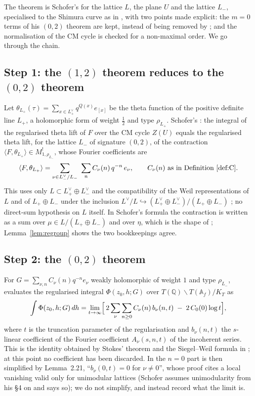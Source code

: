 \documentclass[11pt,reqno]{amsart}
\theoremstyle{plain}
\theoremstyle{definition}
\newcommand{\Q}{\mathbb{Q}}
\newcommand{\A}{\mathbb{A}}
\newcommand{\Ldual}{L^{\vee}}
\newcommand{\Lm}{L_{-}}
\newcommand{\Lp}{L_{+}}
\begin{document}
The theorem is Schofer's \cite[Thm.~3.4(ii), Cor.~3.5(i)]{Schofer} for the lattice $L$, the
plane $U$ and the lattice $\Lm$, specialised to the Shimura curve as in \cite[Thm.~B]{Yang}, with
two points made explicit: the $m=0$ terms of his $(0,2)$ theorem are kept, instead of being
removed by \cite[Lemma~2.21]{Schofer}; and the normalisation of the CM cycle is checked for a
non-maximal order. We go through the chain.

\subsection*{Step 1: the $(1,2)$ theorem reduces to the $(0,2)$ theorem}
Let $\theta_{\Lp}(\tau)=\sum_{x\in\Lp^\vee}q^{Q(x)}e_{[x]}$ be the theta function of the positive
definite line $\Lp$, a holomorphic form of weight $\tfrac12$ and type $\rho_{\Lp}$. Schofer's
\cite[Prop.~3.1, Cor.~3.2]{Schofer}: the integral of the regularised theta lift of $F$ over the
CM cycle $Z(U)$ equals the regularised theta lift, for the lattice $\Lm$ of signature $(0,2)$,
of the contraction $\langle F,\theta_{\Lp}\rangle\in M^!_{1,\rho_{\Lm}}$, whose Fourier coefficients
are
\[
  \langle F,\theta_{\Lp}\rangle=\sum_{\nu\in\Lm^\vee/\Lm}\ \sum_{n}C_\nu(n)\,q^{-n}\,e_\nu,
  \qquad C_\nu(n)\text{ as in Definition~\ref{def:C}}.
\]
This uses only $L\subset\Lp^\vee\oplus\Lm^\vee$ and the compatibility of the Weil representations
of $L$ and of $\Lp\oplus\Lm$ under the inclusion $\Ldual/L\hookrightarrow(\Lp^\vee\oplus\Lm^\vee)/
(\Lp\oplus\Lm)$ \cite[Lemma~3.3]{Schofer}; no direct-sum hypothesis on $L$ itself. In
Schofer's formula the contraction is written as a sum over $\mu\in L/(\Lp\oplus\Lm)$ and over
$\eta$, which is the shape of \cite[(12)]{Yang}; Lemma~\ref{lem:regroup} shows the two
bookkeepings agree.

\subsection*{Step 2: the $(0,2)$ theorem}
For $G=\sum_{\nu,n}C_\nu(n)q^{-n}e_\nu$ weakly holomorphic of weight $1$ and type $\rho_{\Lm}$,
\cite[Thm.~3.4(ii)]{Schofer} evaluates the regularised integral $\Phi(z_0,h;G)$ over
$T(\Q)\backslash T(\A_f)/K_T$ as
\begin{equation}\label{eq:02}
  \int\Phi(z_0,h;G)\,dh=\lim_{t\to\infty}\Bigl[\,2\sum_{\nu}\sum_{n\ge0}C_\nu(n)\,b_\nu(n,t)
  \;-\;2\,C_0(0)\log t\Bigr],
\end{equation}
where $t$ is the truncation parameter of the regularisation and $b_\nu(n,t)$ the $s$-linear
coefficient of the Fourier coefficient $A_\nu(s,n,t)$ of the incoherent series. This is the
identity obtained by Stokes' theorem and the Siegel--Weil formula in \cite[(33) and the following
page]{Schofer}; at this point no coefficient has been discarded. In \cite{Schofer} the $n=0$ part
is then simplified by Lemma~2.21, ``$b_\nu(0,t)=0$ for $\nu\neq0$'', whose proof cites a local
vanishing valid only for unimodular lattices (Schofer assumes unimodularity from his \S4 on and says
so); we do not simplify, and instead record what the limit is.
\end{document}
